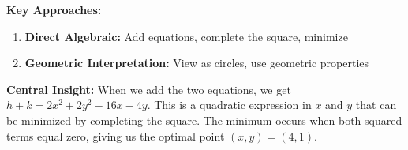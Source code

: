 \documentclass[12pt]{article}
\begin{document}
\begin{problemconfigbox}
\textbf{Key Approaches:}
\begin{enumerate}
    \item \textbf{Direct Algebraic:} Add equations, complete the square, minimize
    \item \textbf{Geometric Interpretation:} View as circles, use geometric properties
\end{enumerate}
\end{problemconfigbox}

\vspace{1em}

\begin{keyinsightbox}
\textbf{Central Insight:} When we add the two equations, we get $h + k = 2x^2 + 2y^2 - 16x - 4y$. This is a quadratic expression in $x$ and $y$ that can be minimized by completing the square. The minimum occurs when both squared terms equal zero, giving us the optimal point $(x, y) = (4, 1)$.
\end{keyinsightbox}

\vspace{1em}
\end{document}
